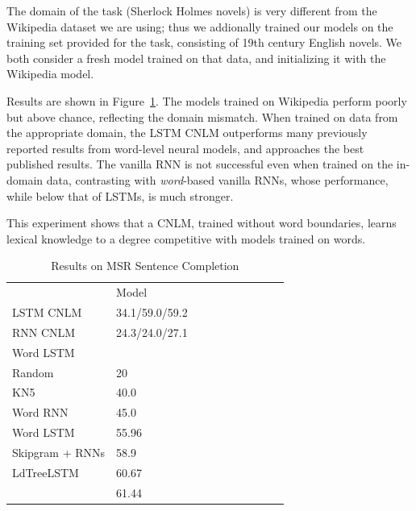 The domain of the task (Sherlock Holmes novels) is very different from the Wikipedia dataset we are using; thus we addionally trained our models on the training set provided for the task, consisting of 19th century English novels.
We both consider a fresh model trained on that data, and initializing it with the Wikipedia model.

Results are shown in Figure~\ref{tab:msr-completion-results}.
The models trained on Wikipedia perform poorly but above chance, reflecting the domain mismatch.
When trained on data from the appropriate domain, the LSTM CNLM outperforms many previously reported results from word-level neural models, and approaches the best published results.
The vanilla RNN is not successful even when trained on the in-domain data, contrasting with \emph{word}-based vanilla RNNs, whose performance, while below that of LSTMs, is much stronger.

This experiment shows that a CNLM, trained without word boundaries, learns lexical knowledge to a degree competitive with models trained on words.

\begin{table}[t]
  \begin{center}
    \begin{tabular}{l|l|l|l|llllll}
      \multicolumn{1}{c}{}& Model \\
LSTM CNLM	    &      34.1/59.0/59.2 \\
	    RNN CNLM &     24.3/24.0/27.1 \\
	    Word LSTM \\ \hline
	    Random & 20 \\
	    KN5  \cite{Mikolov:2012} & 40.0 \\
            Word RNN & 45.0 \\
	    Word LSTM \cite{zhang2016top} & 55.96 \\
Skipgram + RNNs \cite{Mikolov:etal:2013b} & 58.9 \\
LdTreeLSTM \cite{zhang2016top} & 60.67 \\
            \cite{woods2016exploiting} &  61.44 \\
    \end{tabular}
  \end{center}
  \caption{\label{tab:msr-completion-results} Results on MSR Sentence Completion}
\end{table}





